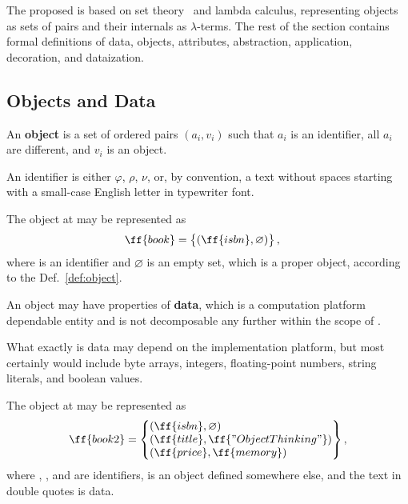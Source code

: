 The proposed \phic{} is based on set theory~\citep{jech2013set} and lambda calculus,
representing objects as sets of pairs and their internals as $\lambda$-terms.
The rest of the section contains formal definitions of
data, objects, attributes, abstraction, application, decoration, and dataization.

\subsection{Objects and Data}

\begin{eodefinition}\label{def:object}
An \textbf{object} is a set of ordered pairs $(a_i, v_i)$ such that
$a_i$ is an identifier, all $a_i$ are different, and $v_i$ is an object.
\end{eodefinition}

An identifier is either $\varphi$, $\rho$, $\nu$, or, by convention, a text without
spaces starting with a small-case English letter in typewriter font.

The object at  may be represented as
\begin{equation}\label{eq:book}
\begin{split}
\ff{book} & = \left\{\begin{matrix*}[l]
  (\ff{isbn}, \varnothing) \\
\end{matrix*}\right\},
\end{split}
\end{equation}
where  is an identifier and $\varnothing$ is an empty
set, which is a proper object, according to the Def.~\ref{def:object}.

\begin{eodefinition}\label{def:data}
An object may have properties of \textbf{data},
which is a computation platform dependable entity and is not
decomposable any further within the scope of \phic{}.
\end{eodefinition}

What exactly is data may depend on the
implementation platform, but most certainly would include
byte arrays, integers, floating-point numbers,
string literals, and boolean values.

The object at  may be represented as
\begin{equation}\label{eq:book2}
\begin{split}
\ff{book2} & = \left\{\begin{matrix*}[l]
  (\ff{isbn}, \varnothing) \\
  (\ff{title}, \ff{"Object Thinking"}) \\
  (\ff{price}, \ff{memory}) \\
\end{matrix*}\right\}, \\
\end{split}
\end{equation}
where , , and  are identifiers,
 is an object defined somewhere else,
and the text in double quotes is data.

